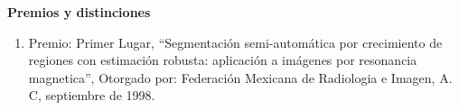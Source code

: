 \textbf{Premios y distinciones}

\begin{enumerate}

\item Premio: Primer Lugar, “Segmentación semi-automática por crecimiento de regiones con estimación robusta: aplicación a imágenes por 
resonancia 
magnetica”, Otorgado por: Federación Mexicana de Radiologia e Imagen, A. C, septiembre de 1998.

\end{enumerate}
